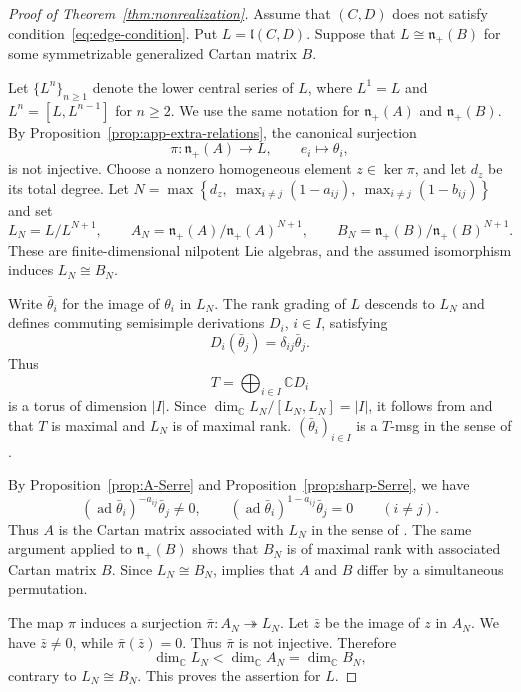 \documentclass[12pt,reqno]{amsart}
\numberwithin{equation}{section}
\theoremstyle{definition}
\theoremstyle{remark}
\newcommand{\C}{\mathbb C}
\newcommand{\nplus}{\mathfrak n_+}
\newcommand{\ad}{\operatorname{ad}}
\theoremstyle{plain}
\theoremstyle{plain}
\begin{document}
\begin{proof}[Proof of Theorem~\ref{thm:nonrealization}]
Assume that $(C,D)$ does not satisfy condition~\eqref{eq:edge-condition}. Put $L=\mathfrak l(C,D)$. Suppose that $L\cong\mathfrak n_+(B)$ for some symmetrizable generalized Cartan matrix $B$. 

Let $\{L^n\}_{n\ge1}$ denote the lower central series of $L$, where $L^1=L$ and $L^n=[L,L^{n-1}]$ for $n\ge2$. We use the same notation for $\mathfrak n_+(A)$ and $\mathfrak n_+(B)$. By Proposition~\ref{prop:app-extra-relations}, the canonical surjection
\[
    \pi:\mathfrak n_+(A)\longrightarrow L,
    \qquad e_i\longmapsto\theta_i,
\]
is not injective. Choose a nonzero homogeneous element $z\in\ker\pi$, and let $d_z$ be its total degree. Let $N=\max\left\{ d_z,\ \max_{i\ne j}(1-a_{ij}),\ \max_{i\ne j}(1-b_{ij})\right\}$ and set 
\[
L_N=L/L^{N+1}, \qquad A_N=\nplus(A)/\nplus(A)^{N+1} ,\qquad B_N=\nplus(B)/\nplus(B)^{N+1}.
\]
These are finite-dimensional nilpotent Lie algebras, and the assumed isomorphism induces $L_N\cong B_N$.

Write $\bar\theta_i$ for the image of $\theta_i$ in $L_N$. The rank grading of $L$ descends to $L_N$ and defines commuting semisimple derivations $D_i$, $i\in I$, satisfying
\[
    D_i(\bar\theta_j)=\delta_{ij}\bar\theta_j.
\]
Thus
\[
    T=\bigoplus_{i\in I}\C D_i
\]
is a torus of dimension $|I|$. Since $\dim_\C L_N/[L_N,L_N]=|I|$, it follows from
\cite[Lemma~2.8]{San82} and \cite[Definition~2.9]{San82} that $T$ is maximal and $L_N$ is of maximal rank. $(\bar\theta_i)_{i\in I}$ is a $T$-msg in the sense of \cite[Definition~2.5]{San82}.

By Proposition~\ref{prop:A-Serre} and Proposition~\ref{prop:sharp-Serre}, we have
\[
    (\ad\bar\theta_i)^{-a_{ij}}\bar\theta_j\ne0,
    \qquad
    (\ad\bar\theta_i)^{1-a_{ij}}\bar\theta_j=0
    \qquad(i\ne j).
\]
Thus $A$ is the  Cartan matrix associated with $L_N$ in the sense of \cite[Theorem~3.2]{San82}. The same argument applied to $\nplus(B)$ shows that $B_N$ is of maximal rank with associated Cartan matrix $B$. Since $L_N\cong B_N$, \cite[Theorem~3.2]{San82} implies that $A$ and $B$ differ by a simultaneous permutation.

The map $\pi$ induces a surjection $\bar\pi: A_N \twoheadrightarrow L_N$. Let $\bar z$ be the image of $z$ in $A_N$. We have $\bar z\ne0$, while $\bar\pi(\bar z)=0$. Thus $\bar\pi$ is not injective. Therefore
\[
    \dim_\C L_N< \dim_\C A_N =\dim_\C B_N,
\]
contrary to $L_N\cong B_N$. This proves the assertion for $L$.


\end{proof}
\end{document}
